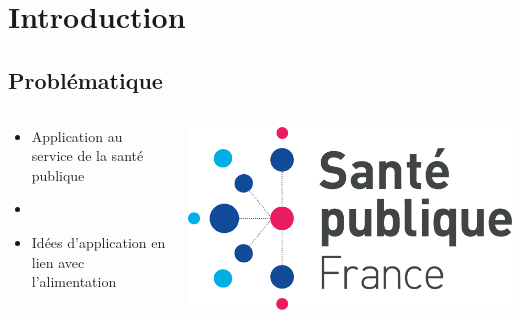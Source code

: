\section{Introduction}
\subsection{Problématique}
\begin{frame}{\insertsubsection}
  \begin{columns}
    \begin{column}{.6\textwidth}
      \begin{itemize}
        \item Application au service de la santé publique
        \item[]
        \item Idées d'application en lien avec l'alimentation
      \end{itemize}
    \end{column}
    \begin{column}{.4\textwidth}
      \includegraphics[width=.8\textwidth]{./Sante-publique-France-logo.pdf}
    \end{column}
  \end{columns}
\end{frame}

